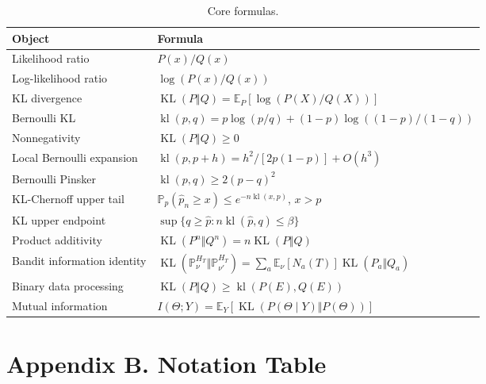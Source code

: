 \documentclass[en,nofont,11pt]{elegantbook}
\newcommand{\E}{\mathbb{E}}
\newcommand{\Pbb}{\mathbb{P}}
\newcommand{\KL}{\operatorname{KL}}
\newcommand{\kl}{\operatorname{kl}}
\begin{document}
\begin{table}[H]
\centering
\caption*{Core formulas.}
\begin{tabular}{p{}p{}}
\toprule
Object & Formula \\
\midrule
Likelihood ratio & $P(x)/Q(x)$ \\
Log-likelihood ratio & $\log(P(x)/Q(x))$ \\
KL divergence & $\KL(P\Vert Q)=\E_P[\log(P(X)/Q(X))]$ \\
Bernoulli KL & $\kl(p,q)=p\log(p/q)+(1-p)\log((1-p)/(1-q))$ \\
Nonnegativity & $\KL(P\Vert Q)\ge0$ \\
Local Bernoulli expansion & $\kl(p,p+h)=h^2/[2p(1-p)]+O(h^3)$ \\
Bernoulli Pinsker & $\kl(p,q)\ge2(p-q)^2$ \\
KL-Chernoff upper tail & $\Pbb_p(\widehat p_n\ge x)\le e^{-n\kl(x,p)}$, $x>p$ \\
KL upper endpoint & $\sup\{q\ge\widehat p:n\kl(\widehat p,q)\le\beta\}$ \\
Product additivity & $\KL(P^n\Vert Q^n)=n\KL(P\Vert Q)$ \\
Bandit information identity & $\KL(\Pbb_\nu^{H_T}\Vert\Pbb_{\nu'}^{H_T})=\sum_a\E_\nu[N_a(T)]\KL(P_a\Vert Q_a)$ \\
Binary data processing & $\KL(P\Vert Q)\ge\kl(P(E),Q(E))$ \\
Mutual information & $I(\Theta;Y)=\E_Y[\KL(P(\Theta\mid Y)\Vert P(\Theta))]$ \\
\bottomrule
\end{tabular}
\end{table}

\chapter*{Appendix B. Notation Table}
\end{document}

